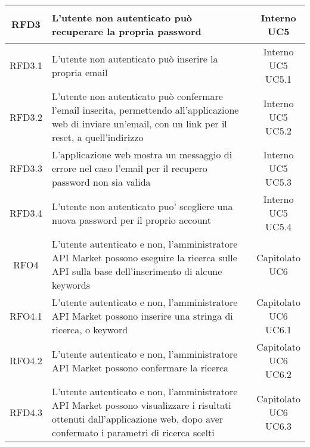 \begin{longtable}{|c|p{8cm}|c|}
\hypertarget{RFD3}{RFD3} & L'utente non autenticato può recuperare la propria password & \makecell*{Interno\\UC5} \\
\hline

\hypertarget{RFD3.1}{RFD3.1} & L'utente non autenticato può inserire la propria email & \makecell*{Interno\\UC5\\UC5.1} \\
\hline
\hypertarget{RFD3.2}{RFD3.2} & L'utente non autenticato può confermare l'email inserita, permettendo all'applicazione web di inviare un'email, con un link per il reset, a quell'indirizzo & \makecell*{Interno\\UC5\\UC5.2} \\
\hline
\hypertarget{RFD3.3}{RFD3.3} & L'applicazione web mostra un messaggio di errore nel caso l'email per il recupero password non sia valida & \makecell*{Interno\\UC5\\UC5.3} \\
\hline

\hline
\hypertarget{RFD3.4}{RFD3.4} & L'utente non autenticato puo' scegliere una nuova password per il proprio account & \makecell*{Interno\\UC5\\UC5.4} \\
\hline

\hypertarget{RFO4}{RFO4} & L'utente autenticato e non, l'amministratore API Market possono eseguire la ricerca sulle API sulla base dell'inserimento di alcune keywords & \makecell*{Capitolato\\UC6} \\
\hline

\hypertarget{RFO4.1}{RFO4.1} & L'utente autenticato e non, l'amministratore API Market possono inserire una stringa di ricerca, o keyword & \makecell*{Capitolato\\UC6\\UC6.1} \\
\hline

\hypertarget{RFO4.2}{RFO4.2} & L'utente autenticato e non, l'amministratore API Market possono confermare la ricerca  & \makecell*{Capitolato\\UC6\\UC6.2} \\
\hline
\hypertarget{RFD4.3}{RFD4.3} & L'utente autenticato e non, l'amministratore API Market possono visualizzare i risultati ottenuti dall'applicazione web, dopo aver confermato i parametri di ricerca scelti & \makecell*{Capitolato\\UC6\\UC6.3} \\
\hline


\end{longtable}
